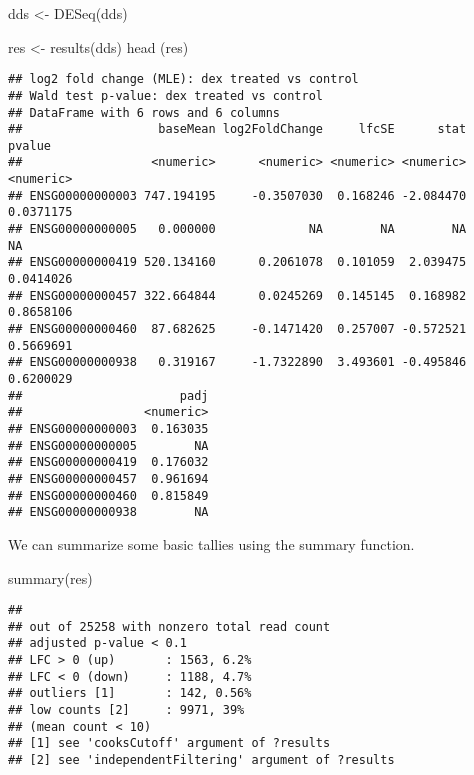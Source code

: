 \documentclass[
]{article}
\newenvironment{Shaded}{\begin{snugshade}}{\end{snugshade}}
\newcommand{\FunctionTok}[1]{\textcolor[rgb]{0.00,0.00,0.00}{#1}}
\newcommand{\NormalTok}[1]{#1}
\newcommand{\OtherTok}[1]{\textcolor[rgb]{0.56,0.35,0.01}{#1}}
\begin{document}
\begin{Shaded}
\begin{Highlighting}[]
\NormalTok{dds }\OtherTok{\textless{}{-}} \FunctionTok{DESeq}\NormalTok{(dds)}
\end{Highlighting}
\end{Shaded}

\begin{Shaded}
\begin{Highlighting}[]
\NormalTok{res }\OtherTok{\textless{}{-}} \FunctionTok{results}\NormalTok{(dds)}
\FunctionTok{head}\NormalTok{ (res)}
\end{Highlighting}
\end{Shaded}

\begin{verbatim}
## log2 fold change (MLE): dex treated vs control 
## Wald test p-value: dex treated vs control 
## DataFrame with 6 rows and 6 columns
##                   baseMean log2FoldChange     lfcSE      stat    pvalue
##                  <numeric>      <numeric> <numeric> <numeric> <numeric>
## ENSG00000000003 747.194195     -0.3507030  0.168246 -2.084470 0.0371175
## ENSG00000000005   0.000000             NA        NA        NA        NA
## ENSG00000000419 520.134160      0.2061078  0.101059  2.039475 0.0414026
## ENSG00000000457 322.664844      0.0245269  0.145145  0.168982 0.8658106
## ENSG00000000460  87.682625     -0.1471420  0.257007 -0.572521 0.5669691
## ENSG00000000938   0.319167     -1.7322890  3.493601 -0.495846 0.6200029
##                      padj
##                 <numeric>
## ENSG00000000003  0.163035
## ENSG00000000005        NA
## ENSG00000000419  0.176032
## ENSG00000000457  0.961694
## ENSG00000000460  0.815849
## ENSG00000000938        NA
\end{verbatim}

We can summarize some basic tallies using the summary function.

\begin{Shaded}
\begin{Highlighting}[]
\FunctionTok{summary}\NormalTok{(res)}
\end{Highlighting}
\end{Shaded}

\begin{verbatim}
## 
## out of 25258 with nonzero total read count
## adjusted p-value < 0.1
## LFC > 0 (up)       : 1563, 6.2%
## LFC < 0 (down)     : 1188, 4.7%
## outliers [1]       : 142, 0.56%
## low counts [2]     : 9971, 39%
## (mean count < 10)
## [1] see 'cooksCutoff' argument of ?results
## [2] see 'independentFiltering' argument of ?results
\end{verbatim}
\end{document}
